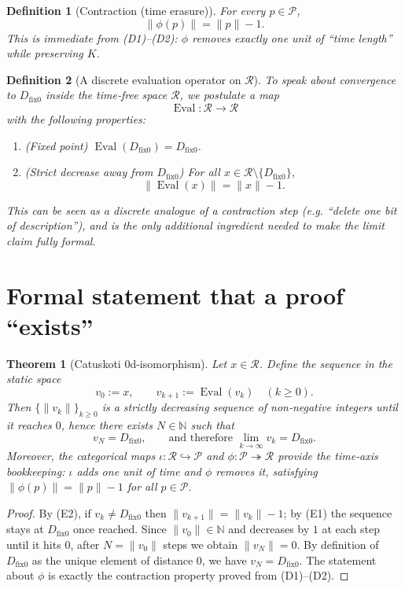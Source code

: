 \documentclass[12pt,a4paper]{article}
\newcommand{\dfix}{D_{\mathrm{fix}0}} %
\newcommand{\Rep}{\mathcal{R}}           %
\newcommand{\Prf}{\mathcal{P}}           %
\newtheorem{definition}{Definition}[section]
\newtheorem{theorem}{Theorem}[section]
\begin{document}
\begin{definition}[Contraction (time erasure)]
For every $p\in\Prf$,
\[
  \|\phi(p)\| = \|p\|-1.
\]
This is immediate from (D1)--(D2): $\phi$ removes exactly one unit of
``time length'' while preserving $K$.
\end{definition}

\begin{definition}[A discrete evaluation operator on $\Rep$]
To speak about convergence to $\dfix$ inside the time‑free space $\Rep$, we
postulate a map
\[
  \operatorname{Eval}:\Rep\to\Rep
\]
with the following properties:
\begin{enumerate}[label=(E\arabic*)]
  \item (Fixed point) $\operatorname{Eval}(\dfix)=\dfix$.
  \item (Strict decrease away from $\dfix$) For all $x\in\Rep\setminus\{\dfix\}$,
        \[
          \|\operatorname{Eval}(x)\| = \|x\|-1.
        \]
\end{enumerate}
This can be seen as a discrete analogue of a contraction step (e.g.
``delete one bit of description''), and is the only additional ingredient
needed to make the limit claim fully formal.
\end{definition}

\section{Formal statement that a proof ``exists''}

\begin{theorem}[Catuskoti $0$d$‑$isomorphism]\label{thm:c4-dfix}
Let $x\in\Rep$. Define the sequence in the static space
\[
  v_0:=x,\qquad v_{k+1}:=\operatorname{Eval}(v_k)\quad(k\ge 0).
\]
Then $\{\|v_k\|\}_{k\ge0}$ is a strictly decreasing sequence of non‑negative
integers until it reaches $0$, hence there exists $N\in\mathbb{N}$ such that
\[
  v_N=\dfix,\qquad\text{and therefore }\lim_{k\to\infty}v_k=\dfix.
\]
Moreover, the categorical maps $\iota:\Rep\hookrightarrow\Prf$ and
$\phi:\Prf\twoheadrightarrow\Rep$ provide the time‑axis bookkeeping:
$\iota$ adds one unit of time and $\phi$ removes it, satisfying
$\|\phi(p)\|=\|p\|-1$ for all $p\in\Prf$.
\end{theorem}
\begin{proof}
By (E2), if $v_k\neq\dfix$ then $\|v_{k+1}\|=\|v_k\|-1$; by (E1) the sequence
stays at $\dfix$ once reached.
Since $\|v_0\|\in\mathbb{N}$ and decreases by $1$ at each step until it hits
$0$, after $N=\|v_0\|$ steps we obtain $\|v_N\|=0$.
By definition of $\dfix$ as the unique element of distance $0$, we have
$v_N=\dfix$.
The statement about $\phi$ is exactly the contraction property proved from
(D1)--(D2).
\end{proof}
\end{document}
